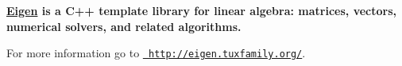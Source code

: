 {\bfseries{\mbox{\hyperlink{namespace_eigen}{Eigen}} is a C++ template library for linear algebra\+: matrices, vectors, numerical solvers, and related algorithms.}}

For more information go to \href{http://eigen.tuxfamily.org/}{\texttt{ http\+://eigen.\+tuxfamily.\+org/}}. 